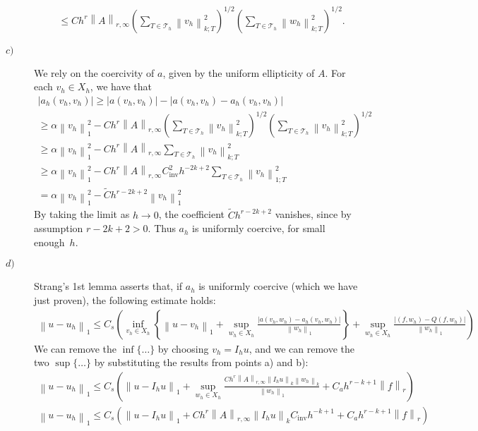 \documentclass[a4paper]{article}
\newcommand{\abs}[1]{\left\lvert#1\right\rvert}
\newcommand{\norm}[1]{\left\lVert#1\right\rVert}
\begin{document}
\begin{description}
\begin{align*}
&	\leq C h^r \norm{A}_{r,\infty}
		\left( \sum_{T \in \mathcal{T}_h} \norm{v_h}_{k;T}^2 \right)^{1/2}
		\left( \sum_{T \in \mathcal{T}_h} \norm{w_h}_{k;T}^2 \right)^{1/2}.
	\end{align*}
\item[$c)$] We rely on the coercivity of $a$, given by the uniform ellipticity of $A$.
	For each $v_h \in X_h$, we have that
	\begin{gather*}
	\abs{a_h(v_h,v_h)} \geq \abs{a(v_h,v_h)} - \abs{a(v_h,v_h) - a_h(v_h,v_h)} \\
	\geq \alpha \norm{v_h}_1^2 - C h^r \norm{A}_{r,\infty}
		\left( \sum_{T \in \mathcal{T}_h} \norm{v_h}_{k;T}^2 \right)^{1/2}
		\left( \sum_{T \in \mathcal{T}_h} \norm{v_h}_{k;T}^2 \right)^{1/2} \\
	\geq \alpha \norm{v_h}_1^2 - C h^r \norm{A}_{r,\infty}
		\sum_{T \in \mathcal{T}_h} \norm{v_h}_{k;T}^2 \\
	\geq \alpha \norm{v_h}_1^2 - C h^r \norm{A}_{r,\infty}
		C_\text{inv}^2 h^{-2k+2} \sum_{T \in \mathcal{T}_h} \norm{v_h}_{1;T}^2 \\
	= \alpha \norm{v_h}_1^2 - \tilde{C} h^{r-2k+2} \norm{v_h}_1^2
	\end{gather*}
	By taking the limit as $h \to 0$, the coefficient $\tilde{C} h^{r-2k+2}$ vanishes,
	since by assumption $r - 2k + 2 > 0$.
	Thus $a_h$ is uniformly coercive, for small enough~$h$.
\item[$d)$] Strang's 1st lemma asserts that, if $a_h$ is uniformly coercive
	(which we have just proven), the following estimate holds:
	\begin{gather*}
	\norm{u-u_h}_1 \leq C_s \left(
		\inf_{v_h \in X_h} \left\lbrace
			\norm{u-v_h}_1
			+ \sup_{w_h \in X_h} \frac{\abs{a(v_h,w_h) - a_h(v_h,w_h)}}{\norm{w_h}_1}
		\right\rbrace
		+ \sup_{w_h \in X_h} \frac{\abs{(f,w_h) - Q(f,w_h)}}{\norm{w_h}_1}
	\right)
	\end{gather*}
	We can remove the $\inf\{\dots\}$ by choosing $v_h = I_h u$, and we can
	remove the two $\sup\{\dots\}$ by substituting the results from points a) and b):
	\begin{gather*}
	\norm{u-u_h}_1 \leq C_s \left(
		\norm{u - I_h u}_1
		+ \sup_{w_h \in X_h} \frac{C h^r \norm{A}_{r,\infty} \norm{I_h u}_k \norm{w_h}_k}
		                          {\norm{w_h}_1}
		+ C_a h^{r-k+1} \norm{f}_r
	\right) \\
	\norm{u-u_h}_1 \leq C_s \left(
		\norm{u - I_h u}_1
		+ C h^r \norm{A}_{r,\infty} \norm{I_h u}_k C_\text{inv} h^{-k+1}
		+ C_a h^{r-k+1} \norm{f}_r
	\right) \\

\end{gather*}
\end{description}
\end{document}
